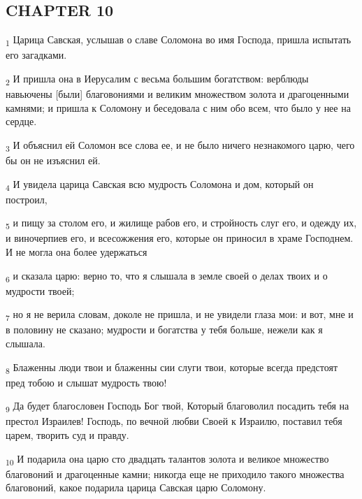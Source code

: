\subsection{CHAPTER 10}
\begin{tcolorbox}
\textsubscript{1} Царица Савская, услышав о славе Соломона во имя Господа, пришла испытать его загадками.
\end{tcolorbox}
\begin{tcolorbox}
\textsubscript{2} И пришла она в Иерусалим с весьма большим богатством: верблюды навьючены [были] благовониями и великим множеством золота и драгоценными камнями; и пришла к Соломону и беседовала с ним обо всем, что было у нее на сердце.
\end{tcolorbox}
\begin{tcolorbox}
\textsubscript{3} И объяснил ей Соломон все слова ее, и не было ничего незнакомого царю, чего бы он не изъяснил ей.
\end{tcolorbox}
\begin{tcolorbox}
\textsubscript{4} И увидела царица Савская всю мудрость Соломона и дом, который он построил,
\end{tcolorbox}
\begin{tcolorbox}
\textsubscript{5} и пищу за столом его, и жилище рабов его, и стройность слуг его, и одежду их, и виночерпиев его, и всесожжения его, которые он приносил в храме Господнем. И не могла она более удержаться
\end{tcolorbox}
\begin{tcolorbox}
\textsubscript{6} и сказала царю: верно то, что я слышала в земле своей о делах твоих и о мудрости твоей;
\end{tcolorbox}
\begin{tcolorbox}
\textsubscript{7} но я не верила словам, доколе не пришла, и не увидели глаза мои: и вот, мне и в половину не сказано; мудрости и богатства у тебя больше, нежели как я слышала.
\end{tcolorbox}
\begin{tcolorbox}
\textsubscript{8} Блаженны люди твои и блаженны сии слуги твои, которые всегда предстоят пред тобою и слышат мудрость твою!
\end{tcolorbox}
\begin{tcolorbox}
\textsubscript{9} Да будет благословен Господь Бог твой, Который благоволил посадить тебя на престол Израилев! Господь, по вечной любви Своей к Израилю, поставил тебя царем, творить суд и правду.
\end{tcolorbox}
\begin{tcolorbox}
\textsubscript{10} И подарила она царю сто двадцать талантов золота и великое множество благовоний и драгоценные камни; никогда еще не приходило такого множества благовоний, какое подарила царица Савская царю Соломону.
\end{tcolorbox}
